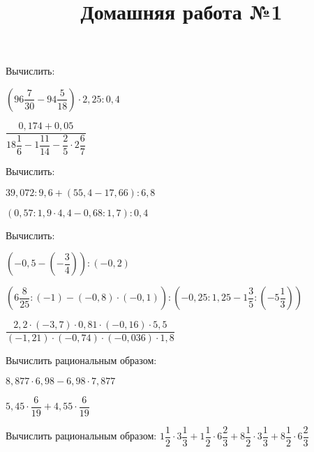 \begin{listofex}
	\item Вычислить:
	\begin{enumcols}[itemcolumns=2]
		\item \( \left( 96\dfrac{7}{30}-94\dfrac{5}{18} \right)\cdot2,25:0,4 \)
		\item \( \dfrac{0,174+0,05}{18\dfrac{1}{6}-1\dfrac{11}{14}-\dfrac{2}{5}\cdot2\dfrac{6}{7}} \)
	\end{enumcols}
	\item Вычислить:
	\begin{enumcols}[itemcolumns=2]
		\item \( 39,072:9,6+(55,4-17,66):6,8 \)
		\item \( (0,57:1,9\cdot4,4-0,68:1,7):0,4 \)
	\end{enumcols}
	\item Вычислить:
	\begin{enumcols}[itemcolumns=1]
		\item \( \left( -0,5-\left( -\dfrac{3}{4} \right) \right):(-0,2) \)
		\item \( \left( 6\dfrac{8}{25}:(-1)-(-0,8)\cdot(-0,1) \right):\left( -0,25:1,25-1\dfrac{3}{5}:\left( -5\dfrac{1}{3} \right) \right) \)
		\item \( \dfrac{2,2\cdot(-3,7)\cdot0,81\cdot(-0,16)\cdot5,5}{(-1,21)\cdot(-0,74)\cdot(-0,036)\cdot1,8} \)
	\end{enumcols}
	\item Вычислить рациональным образом:
	\begin{enumcols}[itemcolumns=2]
		\item \( 8,877\cdot6,98-6,98\cdot7,877 \)
		\item \( 5,45\cdot\dfrac{6}{19}+4,55\cdot\dfrac{6}{19} \)
	\end{enumcols}
	\item Вычислить рациональным образом: \( 1\dfrac{1}{2}\cdot3\dfrac{1}{3}+1\dfrac{1}{2}\cdot6\dfrac{2}{3}+8\dfrac{1}{2}\cdot3\dfrac{1}{3}+8\dfrac{1}{2}\cdot6\dfrac{2}{3} \)
\end{listofex}
\newpage
\title{Домашняя работа №1}
